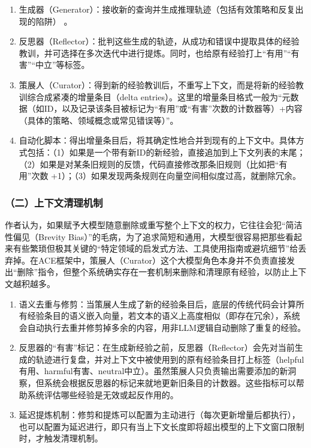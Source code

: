 \begin{enumerate}
\def\labelenumi{\arabic{enumi}.}
\item
  生成器（Generator）：接收新的查询并生成推理轨迹（包括有效策略和反复出现的陷阱） 。
\item
  反思器（Reflector）：批判这些生成的轨迹，从成功和错误中提取具体的经验教训，并可选择在多次迭代中进行提炼。同时，也给原有经验打上``有用''``有害''``中立''等标签。
\item
  策展人（Curator）：得到新的经验教训后，不重写上下文，而是将新的经验教训综合成紧凑的增量条目（delta entries）。这里的增量条目格式一般为``元数据（如ID，以及记录该条目被标记为``有用''或``有害''次数的计数器等）+内容（具体的策略、领域概念或常见错误等）''。
\item
  自动化脚本：得出增量条目后，将其确定性地合并到现有的上下文中。具体方式包括：（1）如果是一个带有新ID的新经验，直接追加到上下文列表的末尾；（2）如果是对某条旧规则的反馈，代码直接修改那条旧规则（比如把``有用''次数 +1）；（3）如果发现两条规则在向量空间相似度过高，就删除冗余。
\end{enumerate}

\hypertarget{ux4e8cux4e0aux4e0bux6587ux6e05ux7406ux673aux5236}{%
\subsubsection{（二）上下文清理机制}\label{ux4e8cux4e0aux4e0bux6587ux6e05ux7406ux673aux5236}}

作者认为，如果赋予大模型随意删除或重写整个上下文的权力，它往往会犯``简洁性偏见（Brevity Bias）''的毛病，为了追求简短和通用，大模型很容易把那些看起来有些繁琐但极其关键的``特定领域的启发式方法、工具使用指南或避坑细节''给丢弃掉。在ACE框架中，策展人（Curator）这个大模型角色本身并不负责直接发出``删除''指令，但整个系统确实存在一套机制来删除和清理原有经验，以防止上下文越积越多。

\begin{enumerate}
\def\labelenumi{\arabic{enumi}.}
\item
  语义去重与修剪：当策展人生成了新的经验条目后，底层的传统代码会计算所有经验条目的语义嵌入向量，若文本的语义上高度相似（即存在冗余），系统会自动执行去重并修剪掉多余的内容，用非LLM逻辑自动删除了重复的经验。
\item
  反思器的``有害''标记：在生成新经验之前，反思器（Reflector）会先对当前生成的轨迹进行复盘，并对上下文中被使用到的原有经验条目打上标签（helpful有用、harmful有害、neutral中立）。虽然策展人只负责输出需要添加的新洞察，但系统会根据反思器的标记来就地更新旧条目的计数器。这些指标可以帮助系统评估哪些经验是无效或起反作用的。
\item
  延迟提炼机制：修剪和提炼可以配置为主动进行（每次更新增量后都执行），也可以配置为延迟进行，即只有当上下文长度即将超出模型的上下文窗口限制时，才触发清理机制。
\end{enumerate}

